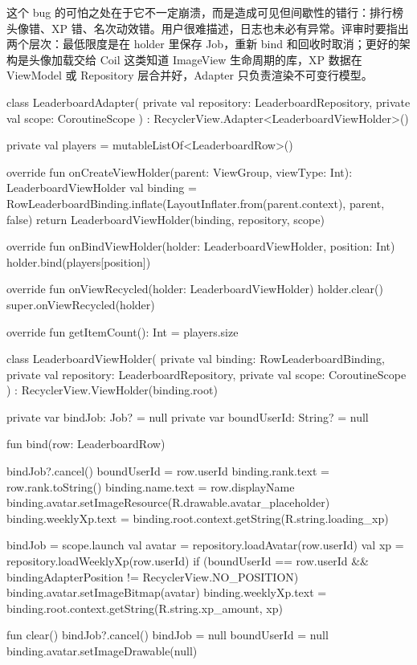 这个 bug 的可怕之处在于它不一定崩溃，而是造成可见但间歇性的错行：排行榜头像错、XP 错、名次动效错。用户很难描述，日志也未必有异常。评审时要指出两个层次：最低限度是在 holder 里保存 Job，重新 bind 和回收时取消；更好的架构是头像加载交给 Coil 这类知道 ImageView 生命周期的库，XP 数据在 ViewModel 或 Repository 层合并好，Adapter 只负责渲染不可变行模型。

\begin{ktfix}
class LeaderboardAdapter(
    private val repository: LeaderboardRepository,
    private val scope: CoroutineScope
) : RecyclerView.Adapter<LeaderboardViewHolder>() {
    private val players = mutableListOf<LeaderboardRow>()

    override fun onCreateViewHolder(parent: ViewGroup, viewType: Int): LeaderboardViewHolder {
        val binding = RowLeaderboardBinding.inflate(LayoutInflater.from(parent.context), parent, false)
        return LeaderboardViewHolder(binding, repository, scope)
    }

    override fun onBindViewHolder(holder: LeaderboardViewHolder, position: Int) {
        holder.bind(players[position])
    }

    override fun onViewRecycled(holder: LeaderboardViewHolder) {
        holder.clear()
        super.onViewRecycled(holder)
    }

    override fun getItemCount(): Int = players.size
}

class LeaderboardViewHolder(
    private val binding: RowLeaderboardBinding,
    private val repository: LeaderboardRepository,
    private val scope: CoroutineScope
) : RecyclerView.ViewHolder(binding.root) {
    private var bindJob: Job? = null
    private var boundUserId: String? = null

    fun bind(row: LeaderboardRow) {
        bindJob?.cancel()
        boundUserId = row.userId
        binding.rank.text = row.rank.toString()
        binding.name.text = row.displayName
        binding.avatar.setImageResource(R.drawable.avatar_placeholder)
        binding.weeklyXp.text = binding.root.context.getString(R.string.loading_xp)

        bindJob = scope.launch {
            val avatar = repository.loadAvatar(row.userId)
            val xp = repository.loadWeeklyXp(row.userId)
            if (boundUserId == row.userId && bindingAdapterPosition != RecyclerView.NO_POSITION) {
                binding.avatar.setImageBitmap(avatar)
                binding.weeklyXp.text = binding.root.context.getString(R.string.xp_amount, xp)
            }
        }
    }

    fun clear() {
        bindJob?.cancel()
        bindJob = null
        boundUserId = null
        binding.avatar.setImageDrawable(null)
    }
}
\end{ktfix}


